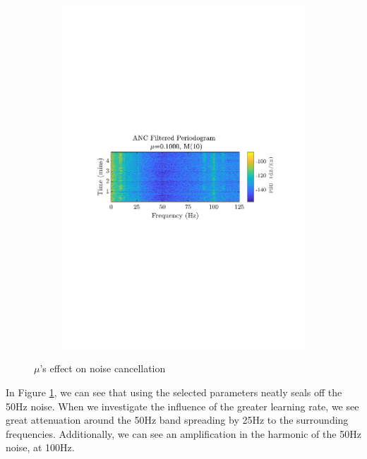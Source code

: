 \documentclass[12pt]{article}
\begin{document}
\begin{figure}[H]
\begin{subfigure}{0.49\textwidth}
					\includegraphics[trim={2.2cm 11.2cm 2.70cm  11.2cm}, clip, width=\textwidth]{../MATLAB/figures/q2_3d_fig05.pdf} 
					\captionsetup{justification=centering}
				\end{subfigure}
				\captionsetup{justification=centering}
				\caption{$\mu$'s effect on noise cancellation}
				\label{fig: 2-3d}
			\end{figure}
		
			In Figure \ref{fig: 2-3d}, we can see that using the selected parameters neatly seals off the 50Hz noise. When we investigate the influence of the greater learning rate, we see great attenuation around the 50Hz band spreading by 25Hz to the surrounding frequencies. Additionally, we can see an amplification in the harmonic of the 50Hz noise, at 100Hz. \\
			
\end{document}
